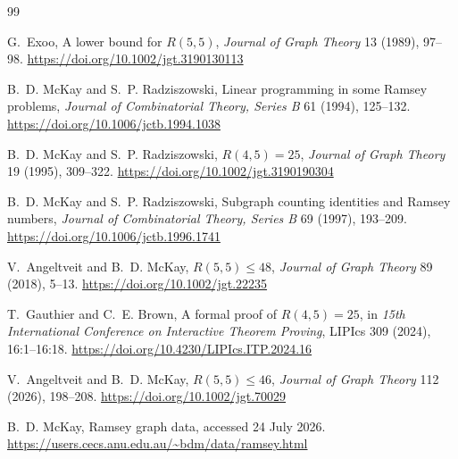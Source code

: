 \documentclass[11pt]{article}
\begin{document}
\begin{thebibliography}{99}

G.~Exoo,
\newblock A lower bound for $R(5,5)$,
\newblock \emph{Journal of Graph Theory} 13 (1989), 97--98.
\newblock \url{https://doi.org/10.1002/jgt.3190130113}

B.~D. McKay and S.~P. Radziszowski,
\newblock Linear programming in some Ramsey problems,
\newblock \emph{Journal of Combinatorial Theory, Series B} 61 (1994),
125--132.
\newblock \url{https://doi.org/10.1006/jctb.1994.1038}

B.~D. McKay and S.~P. Radziszowski,
\newblock $R(4,5)=25$,
\newblock \emph{Journal of Graph Theory} 19 (1995), 309--322.
\newblock \url{https://doi.org/10.1002/jgt.3190190304}

B.~D. McKay and S.~P. Radziszowski,
\newblock Subgraph counting identities and Ramsey numbers,
\newblock \emph{Journal of Combinatorial Theory, Series B} 69 (1997),
193--209.
\newblock \url{https://doi.org/10.1006/jctb.1996.1741}

V.~Angeltveit and B.~D. McKay,
\newblock $R(5,5)\leq48$,
\newblock \emph{Journal of Graph Theory} 89 (2018), 5--13.
\newblock \url{https://doi.org/10.1002/jgt.22235}

T.~Gauthier and C.~E. Brown,
\newblock A formal proof of $R(4,5)=25$,
\newblock in \emph{15th International Conference on Interactive Theorem
Proving}, LIPIcs 309 (2024), 16:1--16:18.
\newblock \url{https://doi.org/10.4230/LIPIcs.ITP.2024.16}

V.~Angeltveit and B.~D. McKay,
\newblock $R(5,5)\leq46$,
\newblock \emph{Journal of Graph Theory} 112 (2026), 198--208.
\newblock \url{https://doi.org/10.1002/jgt.70029}

B.~D. McKay,
\newblock Ramsey graph data,
\newblock accessed 24 July 2026.
\newblock \url{https://users.cecs.anu.edu.au/~bdm/data/ramsey.html}

\end{thebibliography}
\end{document}
